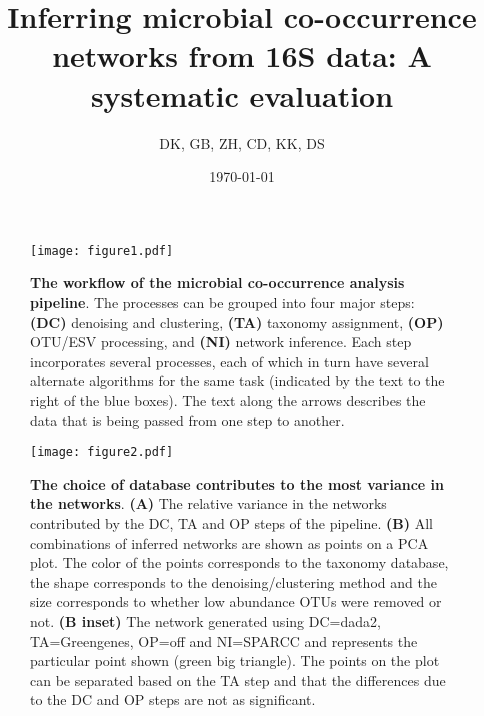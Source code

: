 




\title{ \huge Inferring microbial co-occurrence networks from 16S data: A systematic evaluation }
\author{DK, GB, ZH, CD, KK, DS}
\date{\today}



\maketitle

\begin{figure}[h]
  \centering
  \texttt{[image: figure1.pdf]}
  \caption{
    \textbf{The workflow of the microbial co-occurrence analysis pipeline}.
    The processes can be grouped into four major steps: \textbf{(DC)} denoising and clustering, \textbf{(TA)} taxonomy assignment, \textbf{(OP)} OTU/ESV processing, and \textbf{(NI)} network inference.
    Each step incorporates several processes, each of which in turn have several alternate algorithms for the same task (indicated by the text to the right of the blue boxes).
    The text along the arrows describes the data that is being passed from one step to another.
  }
  \label{fig:figure1}
\end{figure}

\begin{figure}[h]
  \centering
  \texttt{[image: figure2.pdf]}
  \caption{
    \textbf{The choice of database contributes to the most variance in the networks}.
    \textbf{(A)} The relative variance in the networks contributed by the DC, TA and OP steps of the pipeline.
    \textbf{(B)} All combinations of inferred networks are shown as points on a PCA plot.
    The color of the points corresponds to the taxonomy database, the shape corresponds to the denoising/clustering method and the size corresponds to whether low abundance OTUs were removed or not.
    \textbf{(B inset)} The network generated using DC=dada2, TA=Greengenes, OP=off and NI=SPARCC and represents the particular point shown (green big triangle).
    The points on the plot can be separated based on the TA step and that the differences due to the DC and OP steps are not as significant.
  }
  \label{fig:figure2}
\end{figure}

